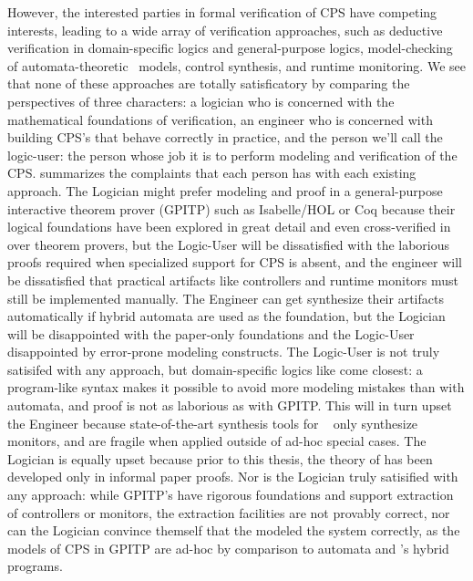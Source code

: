 \documentclass[12pt]{cmuthesis}
\theoremstyle{definition}
\theoremstyle{remark}
\newcommand{\rref}[2][]{\prettyref{#2}}
\newcommand{\Isabelle}{Isabelle/HOL\xspace}
\newcommand{\Coq}{Coq\xspace}
\begin{document}
However, the interested parties in formal verification of CPS have competing interests, leading to a wide array of verification approaches, such as deductive verification in domain-specific logics and general-purpose logics, model-checking of automata-theoretic~\cite{DBLP:conf/lics/Henzinger96} models, control synthesis, and runtime monitoring.
We see that none of these approaches are totally satisficatory by comparing the perspectives of three characters: a logician who is concerned with the mathematical foundations of verification, an engineer who is concerned with building CPS's that behave correctly in practice, and the person we'll call the logic-user: the person whose job it is to perform modeling and verification of the CPS.
\rref{tab:approach-comparison} summarizes the complaints that each person has with each existing approach.
The Logician might prefer modeling and proof in a general-purpose interactive theorem prover (GPITP) such as \Isabelle or \Coq because their logical foundations have been explored in great detail and even cross-verified in over theorem provers, but the Logic-User will be dissatisfied with the laborious proofs required when specialized support for CPS is absent, and the engineer will be dissatisfied that practical artifacts like controllers and runtime monitors must still be implemented manually.
The Engineer can get synthesize their artifacts automatically if hybrid automata are used as the foundation, but the Logician will be disappointed with the paper-only foundations and the Logic-User disappointed by error-prone modeling constructs.
The Logic-User is not truly satisifed with any approach, but domain-specific logics like \dL come closest: a program-like syntax makes it possible to avoid more modeling mistakes than with automata, and proof is not as laborious as with GPITP.
This will in turn upset the Engineer because state-of-the-art synthesis tools for \dL~\cite{DBLP:journals/fmsd/MitschP16} only synthesize monitors, and are fragile when applied outside of ad-hoc special cases.
The Logician is equally upset because prior to this thesis, the theory of \dL has been developed only in informal paper proofs.
Nor is the Logician truly satisified with any approach: while GPITP's have rigorous foundations and support extraction of controllers or monitors, the extraction facilities are not provably correct, nor can the Logician convince themself that the modeled the system correctly, as the models of CPS in GPITP are ad-hoc by comparison to automata and \dL's hybrid programs.
\end{document}
